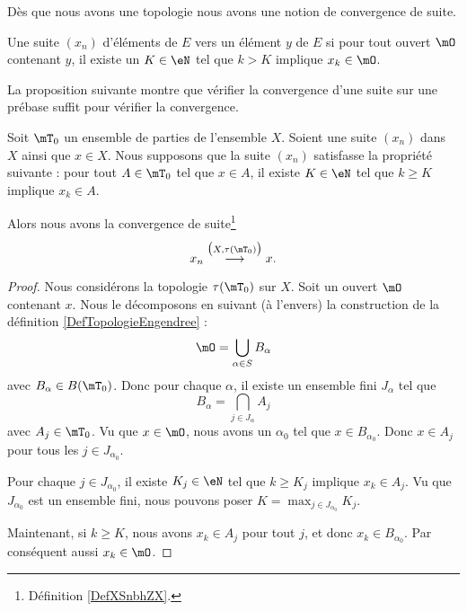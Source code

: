 Dès que nous avons une topologie nous avons une notion de convergence de suite.
\begin{definition} \label{DefXSnbhZX}
    Une suite $(x_n)$ d'éléments de $E$  vers un élément $y$ de $E$ si pour tout ouvert $\mO$ contenant $y$, il existe un $K\in \eN$ tel que $k>K$ implique $x_k\in\mO$.
\end{definition}

La proposition suivante montre que vérifier la convergence d'une suite sur une prébase suffit pour vérifier la convergence.
\begin{proposition}     \label{PROPooJTJBooNtczsO}
    Soit \( \mT_0\) un ensemble de parties de l'ensemble \( X\). Soient une suite \( (x_n)\) dans \( X\) ainsi que \( x\in X\). Nous supposons que la suite \( (x_n)\) satisfasse la propriété suivante : pour tout \( A\in \mT_0\) tel que \( x\in A\), il existe \( K\in \eN\) tel que \( k\geq K\) implique \( x_k\in A\). 

    Alors nous avons la convergence de suite\footnote{Définition \ref{DefXSnbhZX}.}
    \begin{equation}
        x_n\stackrel{\big( X,\tau(\mT_0) \big)}{\longrightarrow}x.
    \end{equation}
\end{proposition}

\begin{proof}
    Nous considérons la topologie \( \tau(\mT_0)\) sur \( X\). Soit un ouvert \( \mO\) contenant \( x\). Nous le décomposons en suivant (à l'envers) la construction de la définition \ref{DefTopologieEngendree} :
    \begin{equation}
        \mO=\bigcup_{\alpha\in S}B_{\alpha}
    \end{equation}
    avec \( B_{\alpha}\in B(\mT_0)\). Donc pour chaque \( \alpha\), il existe un ensemble fini \( J_{\alpha}\) tel que
    \begin{equation}
        B_{\alpha}=\bigcap_{j\in J_{\alpha}}A_j
    \end{equation}
    avec \( A_j\in \mT_0\). Vu que \( x\in \mO\), nous avons un \( \alpha_0\) tel que \( x\in B_{\alpha_0}\). Donc \( x\in A_j\) pour tous les \( j\in J_{\alpha_0}\). 
    
    Pour chaque \( j\in J_{\alpha_0}\), il existe \( K_j\in \eN\) tel que \( k\geq K_j\) implique \( x_k\in A_j\). Vu que \( J_{\alpha_0}\) est un ensemble fini, nous pouvons poser \( K=\max_{j\in J_{\alpha_0}}K_j\).

    Maintenant, si \( k\geq K\), nous avons \( x_k\in A_j\) pour tout \( j\), et donc \( x_k\in B_{\alpha_0}\). Par conséquent aussi \( x_k\in \mO\).
\end{proof}



